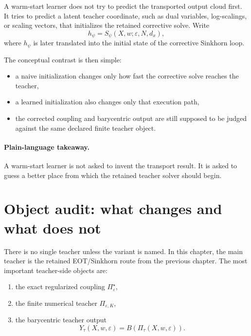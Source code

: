 A warm-start learner does not try to predict the transported output cloud first.
It tries to predict a latent teacher coordinate, such as dual variables,
log-scalings, or scaling vectors, that initializes the retained corrective solve.
Write
\begin{equation}
\label{eq:bf-learned-ot-student-map}
  h_\psi = S_\psi(X,w;\varepsilon,N,d_x),
\end{equation}
where \(h_\psi\) is later translated into the initial state of the corrective
Sinkhorn loop.

The conceptual contrast is then simple:
\begin{itemize}
  \item a naive initialization changes only how fast the corrective solve reaches
  the teacher,
  \item a learned initialization also changes only that execution path,
  \item the corrected coupling and barycentric output are still supposed to be
  judged against the same declared finite teacher object.
\end{itemize}

\paragraph{Plain-language takeaway.}
A warm-start learner is not asked to invent the transport result.  It is asked to
guess a better place from which the retained teacher solver should begin.

\section{Object audit: what changes and what does not}
\label{sec:bf-learned-ot-hierarchy}

There is no single teacher unless the variant is named.  In this chapter, the
main teacher is the retained EOT/Sinkhorn route from the previous chapter.  The
most important teacher-side objects are:
\begin{enumerate}[label=(\roman*)]
  \item the exact regularized coupling \(\Pi_\varepsilon^\star\),
  \item the finite numerical teacher \(\Pi_{\varepsilon,K}\),
  \item the barycentric teacher output
  \begin{equation}
  \label{eq:bf-learned-ot-barycentric-teacher}
    Y_\tau(X,w,\varepsilon)=B(\Pi_\tau(X,w,\varepsilon)).
  \end{equation}
\end{enumerate}

